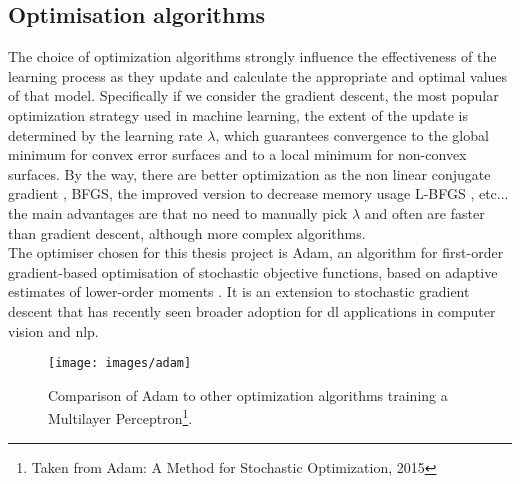 \subsection{Optimisation algorithms}
\label{nn:optmalgo}
The choice of optimization algorithms strongly influence the effectiveness of the learning process as they update and calculate the appropriate and optimal values of that model. Specifically if we consider the gradient descent, the most popular optimization strategy used in machine learning, the extent of the update is determined by the learning rate $\lambda$, which guarantees convergence to the global minimum for convex error surfaces and to a local minimum for non-convex surfaces. By the way, there are better optimization as the non linear conjugate gradient \cite[]{conjugategradient}, BFGS, the improved version to decrease memory usage L-BFGS \cite[]{saputro2017limited}, etc... the main advantages are that no need to manually pick $\lambda$ and often are faster than gradient descent, although more complex algorithms. \\

\noindent The optimiser chosen for this thesis project is Adam, an algorithm for first-order gradient-based optimisation of stochastic objective functions, based on adaptive estimates of lower-order moments \cite[]{kingma2017adam}. It is an extension to stochastic gradient descent that has recently seen broader adoption for \gls{dl} applications in computer vision and \gls{nlp}.

\begin{figure}[H]
	\begin{minipage}{\textwidth}
		\centering
		\texttt{[image: images/adam]}
		\caption[Comparison of Adam to other optimization algorithms.]{Comparison of Adam to other optimization algorithms training a Multilayer Perceptron\footnote{Taken from Adam: A Method for Stochastic Optimization, 2015}.}
		\label{fig:adam}
	\end{minipage}
\end{figure}